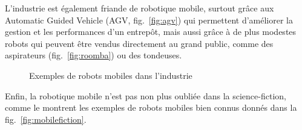 \documentclass[french,A4paper,]{book}
\begin{document}
L'industrie est également friande de robotique mobile, surtout grâce aux
Automatic Guided Vehicle (AGV, fig.~\ref{fig:agv}) qui permettent
d'améliorer la gestion et les performances d'un entrepôt, mais aussi
grâce à de plus modestes robots qui peuvent être vendus directement au
grand public, comme des aspirateurs (fig.~\ref{fig:roomba}) ou des
tondeuses.

\begin{figure}
\centering

\hspace*{\fill}
\hfill%
\hspace*{\fill}

\caption{Exemples de robots mobiles dans l'industrie}

\label{fig:mobileindustrie}

\end{figure}

Enfin, la robotique mobile n'est pas non plus oubliée dans la
science-fiction, comme le montrent les exemples de robots mobiles bien
connus donnés dans la fig.~\ref{fig:mobilefiction}.
\end{document}

